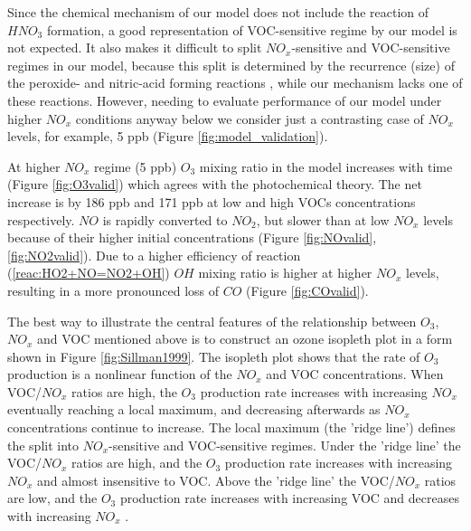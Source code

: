 \documentclass[11pt,a4paper]{article}
\begin{document}
Since the chemical mechanism of our model does not include the reaction of $HNO_3$ formation, a good representation of VOC-sensitive regime by our model is not expected. It also makes it difficult to split $NO_x$-sensitive and VOC-sensitive regimes in our model, because this split is determined by the recurrence (size) of the peroxide- and nitric-acid forming reactions \citep{Sillman1999}, while our mechanism lacks one of these reactions. However, needing to evaluate performance of our model under higher $NO_x$ conditions anyway below we consider just a contrasting case of $NO_x$ levels, for example, 5 ppb (Figure \ref{fig:model_validation}).

At higher $NO_x$ regime (5 ppb) $O_3$ mixing ratio in the model increases with time (Figure \ref{fig:O3valid}) which agrees with the photochemical theory. The net increase is by 186 ppb and 171 ppb at low and high VOCs concentrations respectively. $NO$ is rapidly converted to $NO_2$, but slower than at low $NO_x$ levels because of their higher initial concentrations (Figure \ref{fig:NOvalid}, \ref{fig:NO2valid}). Due to a higher efficiency of reaction (\ref{reac:HO2+NO=NO2+OH}) $OH$ mixing ratio is higher at higher $NO_x$ levels, resulting in a more pronounced loss of $CO$ (Figure \ref{fig:COvalid}).

The best way to illustrate the central features of the relationship between $O_3$, $NO_x$ and VOC mentioned above is to construct an ozone isopleth plot in a form shown in Figure \ref{fig:Sillman1999}. The isopleth plot shows that the rate of $O_3$ production is a nonlinear function of the $NO_x$ and VOC concentrations. When VOC/$NO_x$ ratios are high, the $O_3$ production rate increases with increasing $NO_x$ eventually reaching a local maximum, and decreasing afterwards as $NO_x$ concentrations continue to increase. The local maximum (the 'ridge line') defines the split into $NO_x$-sensitive and VOC-sensitive regimes. Under the 'ridge line' the VOC/$NO_x$ ratios are high, and the $O_3$ production rate increases with increasing $NO_x$ and almost insensitive to VOC. Above the 'ridge line' the VOC/$NO_x$ ratios are low, and the $O_3$ production rate increases with increasing VOC and decreases with increasing $NO_x$ \citep{Sillman2013}.
\end{document}
